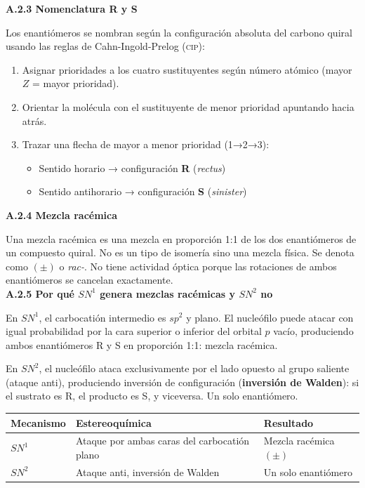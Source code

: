 \label{sec:anexo:quiralidad:rs}
\textbf{A.2.3 Nomenclatura R y S}

Los enantiómeros se nombran según la configuración absoluta del carbono quiral usando las reglas
de Cahn-Ingold-Prelog (\textsc{cip}):

\begin{enumerate}
\item Asignar prioridades a los cuatro sustituyentes según número atómico (mayor $Z$ = mayor
prioridad).
\item Orientar la molécula con el sustituyente de menor prioridad apuntando hacia atrás.
\item Trazar una flecha de mayor a menor prioridad (1→2→3):
\begin{itemize}
\item Sentido horario → configuración \textbf{R} (\textit{rectus})
\item Sentido antihorario → configuración \textbf{S} (\textit{sinister})
\end{itemize}
\end{enumerate}

\label{sec:anexo:quiralidad:rac}
\textbf{A.2.4 Mezcla racémica}

Una mezcla racémica es una mezcla en proporción 1:1 de los dos enantiómeros de un compuesto quiral.
No es un tipo de isomería sino una mezcla física. Se denota como $(\pm)$ o \textit{rac-}. No tiene
actividad óptica porque las rotaciones de ambos enantiómeros se cancelan exactamente. \\

\label{sec:anexo:quiralidad:sn}
\textbf{A.2.5 Por qué $SN^1$ genera mezclas racémicas y $SN^2$ no}

En $SN^1$, el carbocatión intermedio es $sp^2$ y plano. El nucleófilo puede atacar con igual
probabilidad por la cara superior o inferior del orbital $p$ vacío, produciendo ambos enantiómeros
R y S en proporción 1:1: mezcla racémica.

En $SN^2$, el nucleófilo ataca exclusivamente por el lado opuesto al grupo saliente (ataque anti),
produciendo inversión de configuración (\textbf{inversión de Walden}): si el sustrato es R, el
producto es S, y viceversa. Un solo enantiómero.

\begin{center}
\small
\begin{tabular}{lll}
\hline
\textbf{Mecanismo} & \textbf{Estereoquímica} & \textbf{Resultado} \\
\hline
$SN^1$ & Ataque por ambas caras del carbocatión plano & Mezcla racémica $(\pm)$ \\
$SN^2$ & Ataque anti, inversión de Walden & Un solo enantiómero \\
\hline
\end{tabular}
\normalsize
\end{center}

